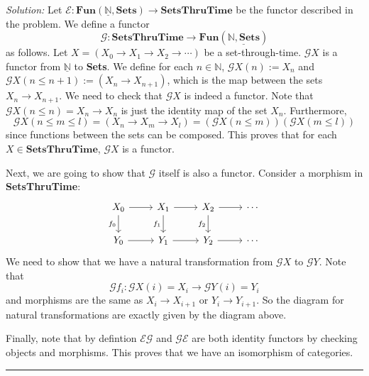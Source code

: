 \documentclass[a4paper, 11pt]{article}
\newenvironment{solution}
    {\textit{Solution:}}
    {}
\begin{document}
\begin{solution}
Let \(\mathcal{E}:\textbf{Fun}(\underline{\mathbb{N}},\textbf{Sets})\rightarrow \textbf{SetsThruTime}\) be the functor described in the problem. We define a functor 
$$\mathcal{G}:\textbf{SetsThruTime}\rightarrow \textbf{Fun}(\underline{\mathbb{N},\textbf{Sets}})$$
as follows. Let \(X=(X_0\rightarrow X_1\rightarrow X_2\rightarrow\cdots)\) be a set-through-time. \(\mathcal{G}X\) is a functor from \(\underline{\mathbb{N}}\) to \textbf{Sets}. We 
define for each \(n\in \mathbb{N}\), \(\mathcal{G}X(n):=X_n\) and \(\mathcal{G}X(n\leq n+1):=(X_n\rightarrow X_{n+1})\), which is the map between the sets \(X_n\rightarrow X_{n+1}\). We need to check that \(\mathcal{G}X\) is indeed a functor. 
Note that \(\mathcal{G}X(n\leq n)=X_n\rightarrow X_n\) is just the identity map of the set \(X_n\). Furthermore, 
$$\mathcal{G}X(n\leq m\leq l)=(X_n\rightarrow X_m\rightarrow X_l)=(\mathcal{G}X(n\leq m))(\mathcal{G}X(m\leq l))$$
since functions between the sets can be composed. This proves that for each \(X\in \textbf{SetsThruTime}\), \(\mathcal{G}X\) is a functor. 
\par 
Next, we are going to show that \(\mathcal{G}\) itself is also a functor. Consider a morphism in \textbf{SetsThruTime}:
$$\begin{tikzcd}
	{X_0} & {X_1} & {X_2} & \cdots \\
	{Y_0} & {Y_1} & {Y_2} & \cdots
	\arrow[from=1-1, to=1-2]
	\arrow["{f_0}"', from=1-1, to=2-1]
	\arrow[from=1-2, to=1-3]
	\arrow["{f_1}"', from=1-2, to=2-2]
	\arrow[from=1-3, to=1-4]
	\arrow["{f_2}"', from=1-3, to=2-3]
	\arrow[from=2-1, to=2-2]
	\arrow[from=2-2, to=2-3]
	\arrow[from=2-3, to=2-4]
\end{tikzcd}$$
We need to show that we have a natural transformation from \(\mathcal{G}X\) to \(\mathcal{G}Y\). Note that 
$$\mathcal{G}f_i:\mathcal{G}X(i)=X_i\rightarrow \mathcal{G}Y(i)=Y_i$$ and morphisms are the same as \(X_i\rightarrow X_{i+1}\) or \(Y_i\rightarrow Y_{i+1}\). So the diagram for 
natural transformations are exactly given by the diagram above. 
\par 
Finally, note that by defintion \(\mathcal{E}\mathcal{G}\) and \(\mathcal{G}\mathcal{E}\) are both identity functors by checking objects and morphisms. This proves that we have an isomorphism of categories. 
\end{solution}
\\ 
\noindent\rule{7in}{2.8pt}
\end{document}
